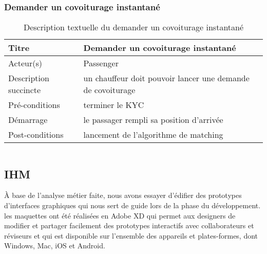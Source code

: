 \subsubsection{Demander un covoiturage instantané} %
\begin{table}[H]
\begin{center}
    \begin{tabular}{ | l | p{10cm} | }
    \hline
    Titre & Demander un covoiturage instantané \\ \hline
    Acteur(s) & Passenger \\ \hline
    Description succincte & un chauffeur doit pouvoir lancer une demande de covoiturage \\ \hline
    Pré-conditions & terminer le KYC \\ \hline
    Démarrage & le passager rempli sa position d'arrivée \\ \hline
    Post-conditions & lancement de l'algorithme de matching \\ \hline
    \end{tabular}
    \caption{Description textuelle du demander un covoiturage instantané}
\end{center}
\end{table}

\begin{tabular}{c}

\end{tabular}

\subsection{IHM} %
\label{sub:ihm}
À base de l'analyse métier faite, nous avons essayer d’édifier des prototypes d'interfaces graphiques qui nous sert de guide lors de la phase du développement.\newline
les maquettes ont été réalisées en Adobe XD qui permet aux designers de modifier et partager facilement des prototypes interactifs avec collaborateurs et réviseurs et qui est disponible sur l'ensemble des appareils et plates-formes, dont Windows, Mac, iOS et Android.

